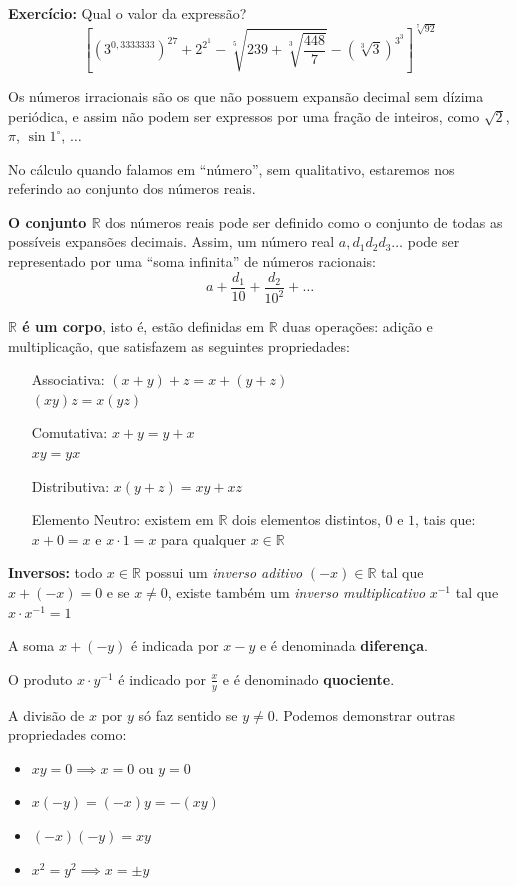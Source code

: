 \documentclass[oneside,a4paper,12pt]{article}
\begin{document}
{\bf Exercício:} Qual o valor da expressão?
$$\left[(3^{0,3333333})^{27}+ 2^{2^1} - \sqrt[5]{239 + \sqrt[3]{\frac{448}{7}}}-(\sqrt[3]{3})^{3^3} \right]^{\sqrt[7]{92}}$$

Os números irracionais são os que não possuem expansão decimal sem dízima periódica, e assim não podem ser expressos por uma fração de inteiros, como $\sqrt{2}$, $\pi$, $\sin 1 ^{\circ}$, $\dots$

No cálculo quando falamos em ``número'', sem qualitativo, estaremos nos referindo ao conjunto dos números reais.

\textbf{O conjunto $\mathbb{R}$} dos números reais pode ser definido como o conjunto de todas as possíveis expansões decimais. Assim, um número real $a,d_{1}d_{2}d_{3}\dots$ pode ser representado por uma ``soma infinita'' de números racionais: $$a + \frac{d_1}{10} + \frac{d_2}{10^2} + \dots $$

\textbf{$\mathbb{R}$ é um corpo}, isto é, estão definidas em $\mathbb{R}$ duas operações: adição e multiplicação, que satisfazem as seguintes propriedades:
\begin{multicols}{2}
\begin{itemize}
	\item [Associativa:] $(x+y)+z = x+(y+z)$ \\ $(xy)z=x(yz)$
	\item [Comutativa:] $x+y=y+x$ \\ $xy=yx$
	\item [Distributiva:] $x(y+z) = xy + xz$
	\item [Elemento Neutro:] existem em $\mathbb{R}$ dois elementos distintos, $0$ e $1$, tais que: $x+0=x$ e $x \cdot 1= x$ para qualquer $x \in \mathbb{R}$
\end{itemize}
\end{multicols}

{\bf Inversos:} todo $x \in \mathbb{R}$ possui um {\it inverso aditivo} $(-x) \in \mathbb{R}$ tal que $x + (-x) = 0$ e se $x \neq 0$, existe também um {\it inverso multiplicativo} $x^{-1}$ tal que $x \cdot x^{-1} = 1$

A soma $x + (-y)$ é indicada por $x-y$ e é denominada {\bf diferença}.

O produto $x \cdot y^{-1} $ é indicado por $\frac{x}{y}$ e é denominado {\bf quociente}.

A divisão de $x$ por $y$ só faz sentido se $y \neq 0$. Podemos demonstrar outras propriedades como:

\begin{itemize}
	\item $xy=0 \implies x =0 \text{ ou } y=0$
	\item $x(-y)=(-x)y = -(xy)$
	\item $(-x)(-y)=xy$
	\item $x^2=y^2 \implies x = \pm y$
\end{itemize}
\end{document}
